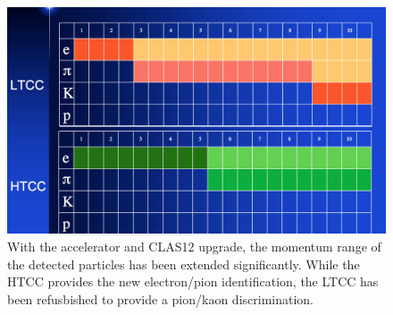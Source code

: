 \begin{figure}
	\centering
	\includegraphics[width=1.0\columnwidth,keepaspectratio]{img/newScope.png}
	\caption{With the accelerator and CLAS12 upgrade, the momentum range of the detected particles has been extended significantly. While the HTCC
            provides the new electron/pion identification, the LTCC has been refusbished to provide a pion/kaon discrimination.}
	\label{fig:newScope}
\end{figure}
